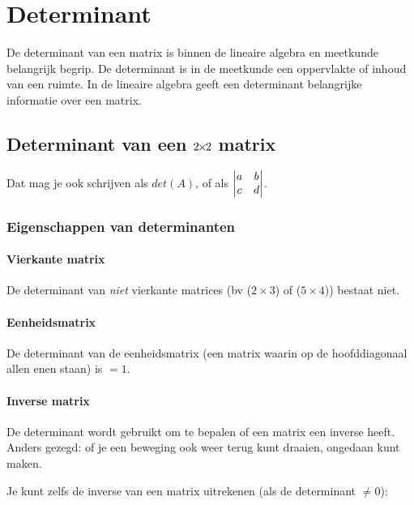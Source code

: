 \chapter{Determinant}
\label{chap: Determinant}
De determinant van een matrix is binnen de lineaire algebra en meetkunde belangrijk begrip. De determinant is in de meetkunde een oppervlakte of inhoud van een ruimte. In de lineaire algebra geeft een determinant belangrijke informatie over een matrix.
\section{Determinant van een $2{\mkern-2mu\times\mkern-2mu}2$ matrix}


Dat mag je ook schrijven als $det(A)$, of als $\begin{vmatrix} a&b \\ c&d \end{vmatrix} $.


\subsection{Eigenschappen van determinanten}
\subsubsection{Vierkante matrix}
De determinant van \textit{niet} vierkante matrices (bv ($2\times 3$) of ($5\times 4$)) bestaat niet.

\subsubsection{Eenheidsmatrix}
De determinant van de eenheidsmatrix (een matrix waarin op de hoofddiagonaal allen enen staan) is $= 1$.

\subsubsection{Inverse matrix}
De determinant wordt gebruikt om te bepalen of een matrix een inverse heeft. Anders gezegd: of je een beweging ook weer terug kunt draaien, ongedaan kunt maken.

Je kunt zelfs de inverse van een matrix uitrekenen (als de determinant $\ne 0 $):


